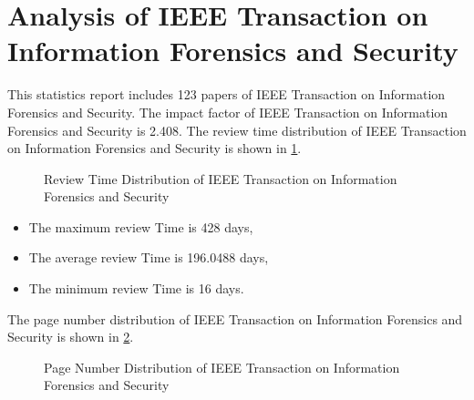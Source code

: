 \documentclass[12pt,
               a4paper,
               journal,
               onecolumn]{IEEEtran}
\begin{document}
\section{Analysis of IEEE Transaction on Information Forensics and Security}
This statistics report includes 123 papers of IEEE Transaction on Information Forensics and Security. The impact factor of IEEE Transaction on Information Forensics and Security is 2.408. The review time distribution of IEEE Transaction on Information Forensics and Security is shown in \cref{fig:Review Time Distribution of IEEE Transaction on Information Forensics and Security}.
\begin{figure}[htb]
  \centering
  \caption{Review Time Distribution of IEEE Transaction on Information Forensics and Security}
  \label{fig:Review Time Distribution of IEEE Transaction on Information Forensics and Security}
\end{figure}

\begin{itemize}
  \item The maximum review Time is 428 days,
  \item The average review Time is 196.0488 days,
  \item The minimum review Time is 16 days.
\end{itemize}

The page number distribution of IEEE Transaction on Information Forensics and Security is shown in \cref{fig:Page Number Distribution of IEEE Transaction on Information Forensics and Security}.
\begin{figure}[htb]
  \centering
  \caption{Page Number Distribution of IEEE Transaction on Information Forensics and Security}
  \label{fig:Page Number Distribution of IEEE Transaction on Information Forensics and Security}
\end{figure}
\end{document}
